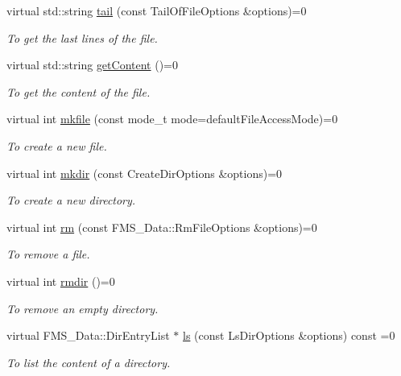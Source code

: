 \begin{DoxyCompactItemize}
virtual std::string \hyperlink{classFile_ab42e1acabd8cf2126590b268adb60952}{tail} (const TailOfFileOptions \&options)=0
\begin{DoxyCompactList}\small\item\em To get the last lines of the file. \item\end{DoxyCompactList}\item 
virtual std::string \hyperlink{classFile_a4b5a13754b6a7a77b50b18ffdeb496b4}{getContent} ()=0
\begin{DoxyCompactList}\small\item\em To get the content of the file. \item\end{DoxyCompactList}\item 
virtual int \hyperlink{classFile_ad61fdb89f84856e17abb7b7f537cd4f3}{mkfile} (const mode\_\-t mode=defaultFileAccessMode)=0
\begin{DoxyCompactList}\small\item\em To create a new file. \item\end{DoxyCompactList}\item 
virtual int \hyperlink{classFile_a7348fafa4ba9c028fff5b57c003879c4}{mkdir} (const CreateDirOptions \&options)=0
\begin{DoxyCompactList}\small\item\em To create a new directory. \item\end{DoxyCompactList}\item 
virtual int \hyperlink{classFile_aa73bca9e79b14a45612e290d9e2736f3}{rm} (const FMS\_\-Data::RmFileOptions \&options)=0
\begin{DoxyCompactList}\small\item\em To remove a file. \item\end{DoxyCompactList}\item 
virtual int \hyperlink{classFile_a7789c3c8671dbdff8b8dfe2cabeaf433}{rmdir} ()=0
\begin{DoxyCompactList}\small\item\em To remove an empty directory. \item\end{DoxyCompactList}\item 
virtual FMS\_\-Data::DirEntryList $\ast$ \hyperlink{classFile_a3793eba26e021e65ec214e36979277da}{ls} (const LsDirOptions \&options) const =0
\begin{DoxyCompactList}\small\item\em To list the content of a directory. \item\end{DoxyCompactList}\item 

\end{DoxyCompactItemize}
